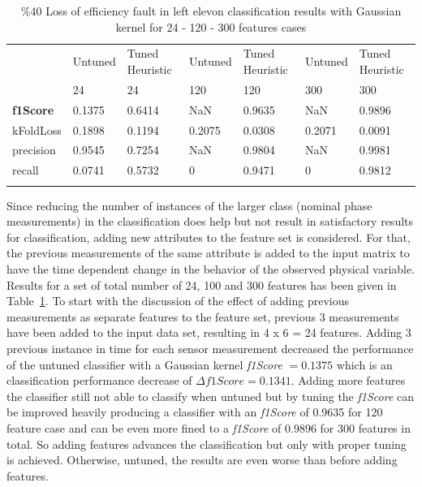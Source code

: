 \begin{table}
	\centering
\caption{\%40 Loss of efficiency fault in left elevon classification results with Gaussian kernel for 24 - 120 - 300 features cases}
\label{tab:loe40_featureAddition}       %
\begin{tabular}{l m{1.6cm} m{1.6 cm} m{1.6 cm} m{1.6 cm} m{1.6 cm} m{1.6 cm}}
\hline\noalign{\smallskip}
 & Untuned & Tuned Heuristic  & Untuned & Tuned Heuristic  & Untuned & Tuned Heuristic \\
 & 24 & 24 & 120 & 120 &  300 &  300 \\
\noalign{\smallskip}\hline\noalign{\smallskip}
\textbf{f1Score} & 0.1375 & 0.6414 & NaN & 0.9635 & NaN & 0.9896\\
kFoldLoss & 0.1898 & 0.1194 &  0.2075 & 0.0308 & 0.2071 & 0.0091\\
precision & 0.9545 & 0.7254 & NaN & 0.9804 & NaN & 0.9981\\
recall & 0.0741 & 0.5732 & 0 & 0.9471 & 0 & 0.9812 \\
\noalign{\smallskip}\hline
\end{tabular}
\end{table}


Since reducing the number of instances of the larger class (nominal phase measurements) in the classification does help but not result in satisfactory results for classification, adding new attributes to the feature set is considered. 
For that, the previous measurements of the same attribute is added to the input matrix to have the time dependent change in the behavior of the observed physical variable. Results for a set of total number of 24, 100 and 300 features has been given in Table~\ref{tab:loe40_featureAddition}. 
To start with the discussion of the effect of adding previous measurements as separate features to the feature set, previous 3 measurements have been added to the input data set, resulting in 4 x 6 = 24 features. 
Adding 3 previous instance in time for each sensor measurement decreased the performance of the untuned classifier with a Gaussian kernel \emph{f1Score} $= 0.1375$ which is an classification performance decrease of $\Delta f1Score = 0.1341$. 
Adding more features the classifier still not able to classify when untuned but by tuning the \emph{f1Score} can be improved heavily producing a classifier with an \emph{f1Score} of 0.9635 for 120 feature case and can be even more fined to a \emph{f1Score} of 0.9896 for 300 features in total.
 So adding features advances the classification but only with proper tuning is achieved. Otherwise, untuned, the results are even worse than before adding features.


